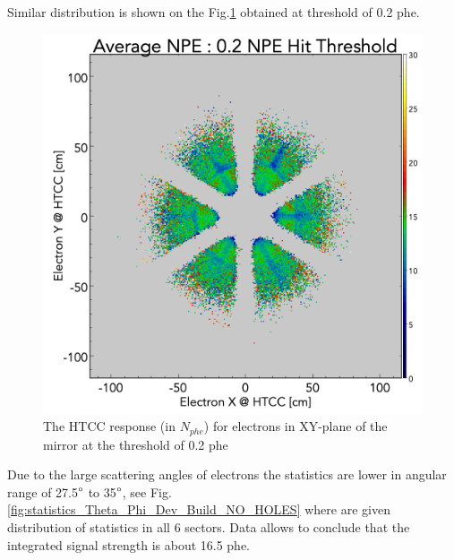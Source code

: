 Similar distribution is shown on the Fig.\ref{fig:avgNPE_XY_Dev_Build_02npe} obtained at threshold of 0.2 phe.
\begin{figure}[!h]
    \centering
    \includegraphics[width=1.0\linewidth,trim={0.0cm 0.0cm 0.0cm 1.67cm},clip]{images/avgNPE_XY_Dev_Build_02npe.png}
    \caption{The HTCC response (in $N_{phe}$) for electrons in XY-plane of the mirror at the threshold of 0.2 phe}
    \label{fig:avgNPE_XY_Dev_Build_02npe}
\end{figure}
Due to the large scattering angles of electrons the statistics are lower in angular range of 27.5$\degree$ to 35$\degree$, see Fig.\ref{fig:statistics_Theta_Phi_Dev_Build_NO_HOLES} where are given distribution of statistics in all 6 sectors. Data allows to conclude that the integrated signal strength is about 16.5 phe.
